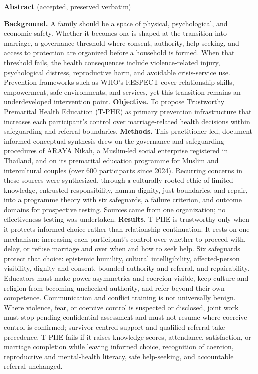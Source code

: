 \documentclass[10pt,twocolumn]{article}
\newcommand{\tphe}{T\mbox{-}PHE}
\begin{document}
\begin{center}
\begin{minipage}{0.92\textwidth}
\small
\noindent\textbf{Abstract} (accepted, preserved verbatim)\par\vspace{2pt}
\textbf{Background.} A family should be a space of physical, psychological, and economic safety. Whether it becomes one is shaped at the transition into marriage, a governance threshold where consent, authority, help-seeking, and access to protection are organized before a household is formed. When that threshold fails, the health consequences include violence-related injury, psychological distress, reproductive harm, and avoidable crisis-service use. Prevention frameworks such as WHO's RESPECT cover relationship skills, empowerment, safe environments, and services, yet this transition remains an underdeveloped intervention point.
\textbf{Objective.} To propose Trustworthy Premarital Health Education (\tphe) as primary prevention infrastructure that increases each participant's control over marriage-related health decisions within safeguarding and referral boundaries.
\textbf{Methods.} This practitioner-led, document-informed conceptual synthesis drew on the governance and safeguarding procedures of ARAYA Nikah, a Muslim-led social enterprise registered in Thailand, and on its premarital education programme for Muslim and intercultural couples (over 600 participants since 2024). Recurring concerns in these sources were synthesized, through a culturally rooted ethic of limited knowledge, entrusted responsibility, human dignity, just boundaries, and repair, into a programme theory with six safeguards, a failure criterion, and outcome domains for prospective testing. Sources came from one organization; no effectiveness testing was undertaken.
\textbf{Results.} \tphe{} is trustworthy only when it protects informed choice rather than relationship continuation. It rests on one mechanism: increasing each participant's control over whether to proceed with, delay, or refuse marriage and over when and how to seek help. Six safeguards protect that choice: epistemic humility, cultural intelligibility, affected-person visibility, dignity and consent, bounded authority and referral, and repairability. Educators must make power asymmetries and coercion visible, keep culture and religion from becoming unchecked authority, and refer beyond their own competence. Communication and conflict training is not universally benign. Where violence, fear, or coercive control is suspected or disclosed, joint work must stop pending confidential assessment and must not resume where coercive control is confirmed; survivor-centred support and qualified referral take precedence. \tphe{} fails if it raises knowledge scores, attendance, satisfaction, or marriage completion while leaving informed choice, recognition of coercion, reproductive and mental-health literacy, safe help-seeking, and accountable referral unchanged.

\end{minipage}
\end{center}
\end{document}
